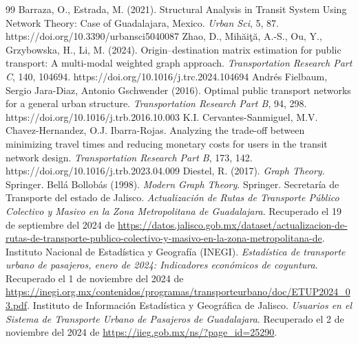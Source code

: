 \documentclass[12pt,oneside]{article}
\begin{document}
\renewcommand{\refname}{Bibliografía}
\begin{thebibliography}{99}
 Barraza, O., Estrada, M. (2021). Structural Analysis in Transit System Using Network Theory: Case of Guadalajara, Mexico. \textit{Urban Sci}, 5, 87. https://doi.org/10.3390/urbansci5040087
 Zhao, D., Mihăiţă, A.-S., Ou, Y., Grzybowska, H., Li, M. (2024). Origin–destination matrix estimation for public transport: A multi-modal weighted graph approach. \textit{Transportation Research Part C}, 140, 104694. https://doi.org/10.1016/j.trc.2024.104694
 Andrés Fielbaum, Sergio Jara-Diaz, Antonio Gschwender (2016). Optimal public transport networks for a general urban structure. \textit{Transportation Research Part B}, 94, 298. 
https://doi.org/10.1016/j.trb.2016.10.003
 K.I. Cervantes-Sanmiguel, M.V. Chavez-Hernandez, O.J. Ibarra-Rojas. Analyzing the trade-off between minimizing travel times and
reducing monetary costs for users in the transit network design. \textit{Transportation Research Part B}, 173, 142.
https://doi.org/10.1016/j.trb.2023.04.009
 Diestel, R. (2017). \textit{Graph Theory}. Springer.
 Bellá Bollobás (1998). \textit{Modern Graph Theory}. Springer.
 Secretaría de Transporte del estado de Jalisco. \textit{Actualización de Rutas de Transporte Público Colectivo y Masivo en la Zona Metropolitana de Guadalajara}. Recuperado el 19 de septiembre del 2024 de \url{https://datos.jalisco.gob.mx/dataset/actualizacion-de-rutas-de-transporte-publico-colectivo-y-masivo-en-la-zona-metropolitana-de}.
 Instituto Nacional de Estadística y Geografía (INEGI).  \textit{Estadística de transporte urbano de pasajeros, enero de 2024: Indicadores económicos de coyuntura}. Recuperado el 1 de noviembre del 2024 de \url{https://inegi.org.mx/contenidos/programas/transporteurbano/doc/ETUP2024_03.pdf}.
 Instituto de Información Estadística y Geográfica de Jalisco. \textit{Usuarios en el Sistema de Transporte Urbano de Pasajeros de Guadalajara}. Recuperado el 2 de noviembre del 2024 de \url{https://iieg.gob.mx/ns/?page_id=25290}.

\end{thebibliography}
\end{document}
